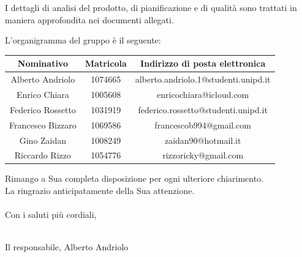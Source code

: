 \documentclass[11pt,a4paper]{letter} %
\begin{document}
\begin{letter}
\noindent
I dettagli di analisi del prodotto, di pianificazione e di qualità sono trattati in maniera approfondita nei documenti allegati.
\newpage

\noindent
L'organigramma del gruppo è il seguente:
\begin{center}
		\centering
		\bgroup
		\def\arraystretch{1.6}
		\begin{tabular}{| c | c | c |}
			\hline
			\textbf{Nominativo} & \textbf{Matricola} & \textbf{Indirizzo di posta elettronica} \\ \hline \hline 
			Alberto Andriolo & 1074665 & alberto.andriolo.1@studenti.unipd.it 
			\\ \hline
			Enrico Chiara & 1005608 & enricochiara@icloud.com \\ \hline
			Federico Rossetto & 1031919 & federico.rossetto@studenti.unipd.it \\ \hline
			Francesco Bizzaro & 1069586 & francescob994@gmail.com  \\ \hline  
			Gino Zaidan & 1008249 & zaidan90@hotmail.it  \\ \hline 
			Riccardo Rizzo & 1054776 & rizzoricky@gmail.com  \\ \hline
		\end{tabular}
	\egroup
\end{center}

\noindent
	Rimango a Sua completa disposizione per ogni ulteriore chiarimento.\\
	La ringrazio anticipatamente della Sua attenzione.
\\
\\
Con i saluti più cordiali,
\\
\\
\begin{flushright}
Il responsabile, Alberto Andriolo \\
\end{flushright}


\closing{}


\end{letter}
\end{document}

